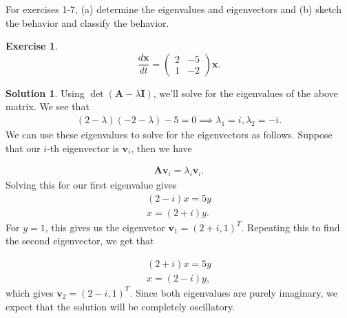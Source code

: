 \documentclass[12pt]{article}
\renewcommand{\vec}[1]{\mathbf{#1}}
\theoremstyle{definition}
\newtheorem{exer}{Exercise}
\newtheorem{sol}{Solution}
\theoremstyle{remark}
\begin{document}
For exercises 1-7, (a) determine the eigenvalues and eigenvectors and (b) sketch the behavior and classify the behavior. 

\begin{exer}
\begin{equation*}
\frac{d \vec{x}}{dt} 
=
\begin{pmatrix}
    2 & -5\\
    1 & -2
\end{pmatrix}
\vec{x}.
\end{equation*}
\end{exer}

\begin{sol}\leavevmode
Using $\det(\vec{A} - \lambda \vec{I})$, we'll solve for the eigenvalues of the above matrix. We see that
\begin{align*}
    (2 - \lambda)(-2 - \lambda) - 5 = 0 \implies \lambda_{1} = i, \lambda_{2} = -i.
\end{align*}
We can use these eigenvalues to solve for the eigenvectors as follows. Suppose that our $i$-th eigenvector is $\vec{v}_{i}$, then we have

\begin{align*}
\vec{A} \vec{v}_{i} = \lambda_{i} \vec{v}_{i}.
\end{align*}
Solving this for our first eigenvalue gives
\begin{align*}
    (2 - i) x = 5y \\
    x = (2 + i)y.
\end{align*}
For $y = 1$, this gives us the eigenvetor $\vec{v}_{1} = (2 + i, 1)^{T}$. Repeating this to find the second eigenvector, we get that

\begin{align*}
    (2 + i) x = 5y \\
    x = (2 - i)y,
\end{align*}
which gives $\vec{v}_{2} = (2 - i, 1)^{T}$. Since both eigenvalues are purely imaginary, we expect that the solution will be completely oscillatory.
 \end{sol}
\end{document}
